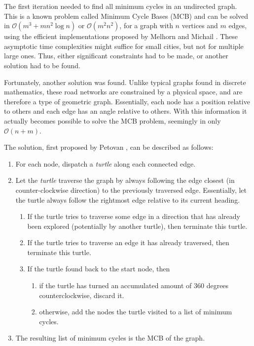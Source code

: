 The first iteration needed to find all minimum cycles in an undirected graph.
This is a known problem called Minimum Cycle Bases (MCB) and can be solved in $\mathcal{O}(m^3 + mn^2 \log n)$ or $\mathcal{O}(m^2n^2)$, for a graph with $n$ vertices and $m$ edges, using the efficient implementations proposed by Melhorn and Michail \cite{mcb_paper}.
These asymptotic time complexities might suffice for small cities, but not for multiple large ones.
Thus, either significant constraints had to be made, or another solution had to be found.

Fortunately, another solution was found.
Unlike typical graphs found in discrete mathematics, these road networks are constrained by a physical space, and are therefore a type of geometric graph.
Essentially, each node has a position relative to others and each edge has an angle relative to others.
With this information it actually becomes possible to solve the MCB problem, seemingly in only $\mathcal{O}(n + m)$.

The solution, first proposed by Petovan \cite{petovan}, can be described as follows:
\vspace{-0.5cm} %
\begin{enumerate}
  \item For each node, dispatch a \textit{turtle} along each connected edge.
  \item Let the \textit{turtle} traverse the graph by always following the edge closest (in counter-clockwise direction) to the previously traversed edge. Essentially, let the turtle always follow the rightmost edge relative to its current heading.
  \begin{enumerate}
    \item If the turtle tries to traverse some edge in a direction that has already been explored (potentially by another turtle), then terminate this turtle.
    \item If the turtle tries to traverse an edge it has already traversed, then terminate this turtle.
    \item If the turtle found back to the start node, then
      \begin{enumerate}
        \item if the turtle has turned an accumulated amount of 360 degrees counterclockwise, discard it.
        \item otherwise, add the nodes the turtle visited to a list of minimum cycles.
      \end{enumerate}
  \end{enumerate}
  \item The resulting list of minimum cycles is the MCB of the graph.
\end{enumerate}

